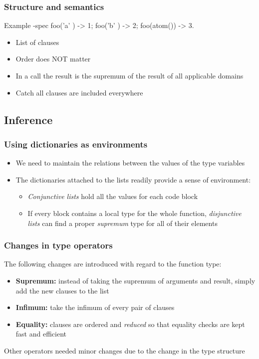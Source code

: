 \documentclass{beamer}
\begin{document}
\begin{frame}[fragile]
  \frametitle{Structure and semantics}
  \begin{code}{Example}
-spec foo('a'   ) -> 1;
      foo('b'   ) -> 2;
      foo(atom()) -> 3.
  \end{code}
  \begin{itemize}
  \item List of clauses
  \item Order does NOT matter
  \item In a call the result is the supremum of the result of all
    applicable domains
  \item Catch all clauses are included everywhere
  \end{itemize}
\end{frame}

\subsection{Inference}

\begin{frame}
  \frametitle{Using dictionaries as environments}
  \begin{itemize}
    \item We need to maintain the relations between the values of the
      type variables \pause
    \item The dictionaries attached to the lists readily provide a
      sense of environment:
      \begin{itemize}
      \item \emph{Conjunctive lists} hold all the values for each code
        block
      \item If every block contains a local type for the whole
        function, \emph{disjunctive lists} can find a proper
        \emph{supremum} type for all of their elements
      \end{itemize}
  \end{itemize}
\end{frame}

\begin{frame}
  \frametitle{Changes in type operators} 
  The following changes are introduced with regard to the function
  type: \pause
  \begin{itemize}
  \item \textbf{Supremum:} instead of taking the supremum of arguments
    and result, simply add the new clauses to the list \pause
  \item \textbf{Infimum:} take the infimum of every pair of clauses
    \pause
  \item \textbf{Equality:} clauses are ordered and \emph{reduced} so
    that equality checks are kept fast and efficient
  \end{itemize} 
  Other operators needed minor changes due to the change in the type
  structure
\end{frame}
\end{document}
